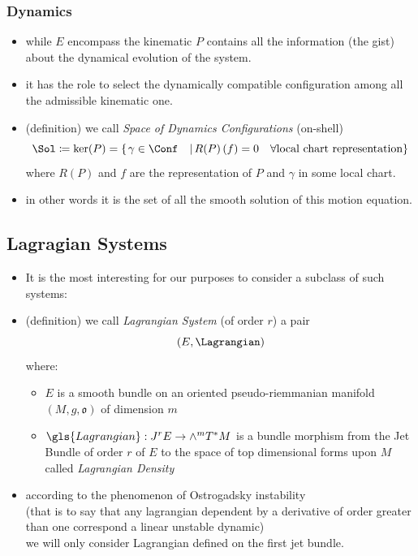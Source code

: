 \documentclass[a4paper,11pt]{scrartcl}
\begin{document}
    \subsubsection*{Dynamics}
    \begin{itemize}
        \item while $E$ encompass the kinematic $P$ contains all the information (the gist) about the dynamical evolution of the system.
        \item it has the role to select the dynamically compatible configuration among all the admissible kinematic one.
        \item (definition) we call \emph{Space of Dynamics Configurations} (on-shell)
        $$             \Sol \coloneqq \ker(P) = \left\{\left. \gamma \in \Conf \quad\right\vert  R(P)\left(f\right) = 0 \quad \forall \textrm{local chart representation}\right\}$$
        where $R(P)$ and $f$ are the representation of $P$ and $\gamma$ in some local chart.
        \item in other words it is the set of all the smooth solution of this motion equation.
    \end{itemize}
    \subsection{Lagragian Systems}
    \begin{itemize}
        \item It is the most interesting for our purposes to consider a subclass of such systems:
        \item (definition) we call \emph{Lagrangian System} (of order $r$) a pair $$(E,\Lagrangian)$$ where:
        \begin{itemize}
            \item $E$ is a smooth bundle on an oriented pseudo-riemmanian manifold $(M,g, \mathfrak{o})$ of dimension $m$
            \item $ \gls{Lagrangian} : J^r E \rightarrow \wedge^m T^*M$ is a bundle morphism from the Jet Bundle of order $r$ of $E$ to the space of top dimensional forms upon $M$ \\
            called \emph{Lagrangian Density}
        \end{itemize}
        \item according to the phenomenon of Ostrogadsky instability\\
        (that is to say that any lagrangian dependent by a derivative of order greater than one correspond a linear unstable dynamic)\\
        we will only consider Lagrangian defined on the first jet bundle.
    \end{itemize}
\end{document}
